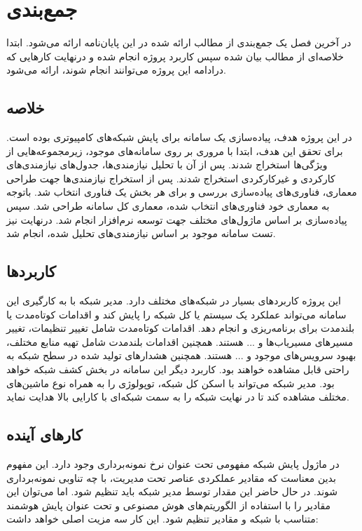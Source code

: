 \chapter{جمع‌بندی}
در آخرین فصل یک جمع‌بندی از مطالب ارائه شده در این پایان‌نامه ارائه می‌شود. ابتدا خلاصه‌ای از مطالب بیان شده سپس کاربرد پروژه انجام شده و درنهایت کارهایی که درادامه این پروژه می‌توانند انجام شوند، ارائه می‌شود.

\section{خلاصه}

در این پروژه هدف، پیاده‌سازی یک سامانه برای پایش شبکه‌های کامپیوتری بوده است. برای تحقق این هدف، ابتدا با مروری بر روی سامانه‌های موجود، زیرمجموعه‌هایی از ویژگی‌ها استخراج شدند. پس از آن با تحلیل نیازمندی‌ها، جدول‌های نیازمندی‌های کارکردی و غیرکارکردی استخراج شدند. پس از استخراج نیازمندی‌ها جهت طراحی معماری، فناوری‌های پیاده‌سازی بررسی و برای هر بخش یک فناوری انتخاب شد. باتوجه به معماری خود فناوری‌های انتخاب شده، معماری کل سامانه طراحی شد. سپس پیاده‌سازی بر اساس ماژول‌های مختلف جهت توسعه نرم‌افزار انجام شد. درنهایت نیز تست سامانه موجود بر اساس نیازمندی‌های تحلیل شده، انجام شد.


\section{کاربرد‌ها}

این پروژه کاربرد‌های بسیار در شبکه‌های مختلف دارد. مدیر شبکه با به کارگیری این سامانه می‌تواند عملکرد یک سیستم یا کل شبکه را پایش کند و اقدامات کوتاه‌مدت یا بلندمدت برای برنامه‌ریزی و انجام دهد. اقدامات کوتاه‌مدت شامل تغییر تنظیمات، تغییر مسیرهای مسیریاب‌ها و ... هستند. همچنین اقدامات بلندمدت شامل تهیه منابع مختلف، بهبود سرویس‌های موجود و ... هستند. همچنین هشدارهای تولید شده در سطح شبکه به راحتی قابل مشاهده خواهند بود. کاربرد دیگر این سامانه در بخش کشف شبکه خواهد بود. مدیر شبکه می‌تواند با اسکن کل شبکه، توپولوژی را به همراه نوع ماشین‌های مختلف مشاهده کند تا در نهایت شبکه را به سمت شبکه‌ای با کارایی بالا هدایت نماید.

\newpage

\section{کار‌های آینده}

در ماژول پایش شبکه مفهومی تحت عنوان نرخ نمونه‌برداری وجود دارد. این مفهوم بدین معناست که مقادیر عملکردی عناصر تحت مدیریت، با چه تناوبی نمونه‌برداری شوند. در حال حاضر این مقدار توسط مدیر شبکه باید تنظیم شود. اما می‌توان این مقادیر را با استفاده از الگوریتم‌های هوش مصنوعی و تحت عنوان پایش هوشمند متناسب با شبکه و مقادیر تنظیم شود. این کار سه مزیت اصلی خواهد داشت:

